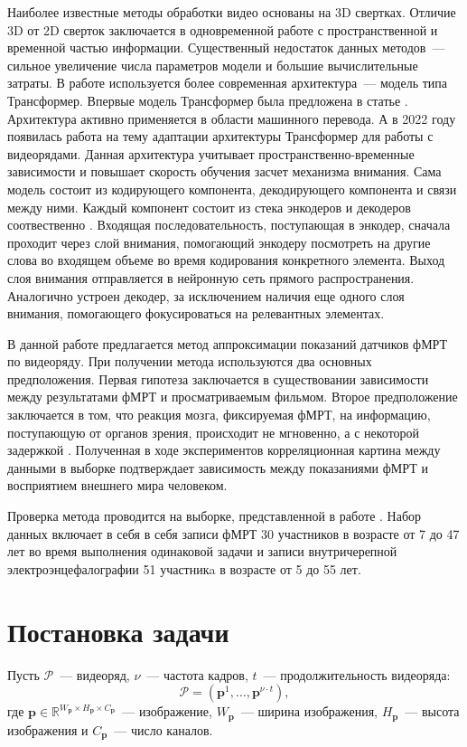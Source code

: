 \documentclass[12pt,twoside]{article}
\begin{document}
Наиболее известные методы обработки видео основаны на 3D свертках. 
Отличие 3D от 2D сверток заключается в одновременной работе с пространственной  
и временной частью информации. Существенный недостаток данных методов~--- 
сильное увеличение числа параметров модели и большие вычислительные затраты.
В работе используется более современная архитектура~--- модель типа Трансформер.
Впервые модель Трансформер была предложена в статье
\citep{https://doi.org/10.48550/arxiv.1706.03762}. Архитектура активно применяется в области машинного перевода.
А в 2022 году появилась работа \citep{transformer} на тему адаптации архитектуры Трансформер для работы с видеорядами. 
Данная архитектура учитывает пространственно-временные зависимости и повышает скорость обучения засчет механизма внимания.
Сама модель состоит из кодирующего компонента, декодирующего компонента и связи между ними. Каждый компонент состоит из стека 
энкодеров и декодеров соотвественно \citep{badrinarayanan2017segnet}. 
Входящая последовательность, поступающая в энкодер, сначала проходит через слой внимания, помогающий энкодеру 
посмотреть на другие слова во входящем объеме во время кодирования конкретного элемента. 
Выход слоя внимания отправляется в нейронную сеть прямого распространения. 
Аналогично устроен декодер, за исключением наличия еще одного слоя внимания, помогающего фокусироваться на релевантных элементах.

В данной работе предлагается метод аппроксимации показаний датчиков фМРТ по видеоряду. 
При получении метода используются два основных предположения. Первая гипотеза заключается в существовании зависимости между результатами фМРТ и просматриваемым фильмом.
Второе предположение заключается в том, что реакция мозга, фиксируемая фМРТ, на информацию, поступающую от органов зрения, происходит не мгновенно, а с некоторой задержкой \citep{Demidov}. 
Полученная в ходе экспериментов корреляционная картина между данными в выборке подтверждает 
зависимость между показаниями фМРТ и восприятием внешнего мира человеком. 

Проверка метода проводится на выборке, представленной в работе \citep{Berezutskaya2022}. 
Набор данных включает в себя в себя записи фМРТ 30 участников в возрасте от 7 до 47 лет во время 
выполнения одинаковой задачи и записи внутричерепной электроэнцефалографии 51 участникa в возрасте от 5 до 55 лет. 


\section{Постановка задачи}
Пусть $\bm{\mathcal{P}}$~--- видеоряд, $\nu$~--- частота кадров, $t$~--- продолжительность видеоряда:
\begin{equation}
    \bm{\mathcal{P}} = (\bm{p}^{1}, \dots, \bm{p}^{\nu \cdot t}),
\end{equation}
где $\bm{p} \in \mathbb{R}^{W_{\bm{p}} \times H_{\bm{p}} \times C_{\bm{p}}}$~--- изображение, $W_{\bm{p}}$~---
ширина изображения, $H_{\bm{p}}$~--- высота изображения и $C_{\bm{p}}$~--- число каналов.
\end{document}
